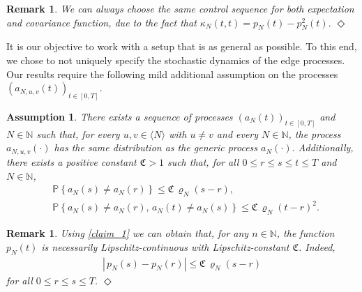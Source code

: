 \documentclass[11pt,reqno]{amsart}
\numberwithin{equation}{section}
\newcommand{\abs}[1]{\left\lvert #1 \right\rvert}
\newcommand{\sprod}[1]{\langle#1\rangle}
\newcommand{\pk}[1]{\mathbb{P} \left\{ #1 \right \} }
\newcommand{\N}{\mathbb{N}}
\newtheorem{ass}[theo]{Assumption}
\newtheorem{remark}[theo]{Remark}
\begin{document}
\begin{remark}{\em 
    We can always choose the same control sequence for both expectation and covariance function, due to the fact that
    $\kappa_N(t,t) = p_N(t) - p_N^2(t).$}
    \hfill ${\Diamond}$
\end{remark}


It is our objective to work with a setup that is as general as possible. To this end, we chose to not uniquely specify the stochastic dynamics of the edge processes. Our results require the following mild additional assumption on the processes $(a_{N,u,v}(t))_{t\in[0,T]}$. 

\begin{ass}\label{ass:ass2}
 {There exists a sequence of processes $(a_{N}(t))_{t\in[0,T]}$ and $N\in\N$ such that, for every $u,v\in\sprod{N}$ with $u\not= v$ and every $N\in\N$, the process $a_{N,u,v}(\cdot)$ has the same distribution as the generic process $a_N(\cdot)$. Additionally,} there exists a positive constant ${\mathfrak{C}}>1$ such that, for all  $0\leqslant r\leqslant  s\leqslant t\leqslant T$ and $N\in\N$,
\begin{align}
    &\pk{a_{N}(s)\not= a_{N}(r)}\leqslant {\mathfrak{C}}\,\varrho_N(s-r),\label{claim_1}\\
    &\pk{a_{N}(s)\not= a_{N}(r),\, a_{N}(t)\not= a_{N}(s)}\leqslant {\mathfrak{C}}\,\varrho_N(t-r)^2.\label{claim_2}
\end{align}
\end{ass}



\begin{remark}{\em 
    Using \eqref{claim_1} we can obtain that, for any $n\in\N$, the function $p_N(t)$ is necessarily Lipschitz-continuous with Lipschitz-constant ${\mathfrak{C}}$. Indeed,
    \begin{align}
        \abs{\,p_N(s)-p_N(r)}\leqslant {\mathfrak{C}}\,\varrho_N(s-r)\label{p_inc_bound}
    \end{align}
for all  $0\leqslant r\leqslant  s\leqslant T$.} \hfill    ${\Diamond}$
\end{remark}
\end{document}
